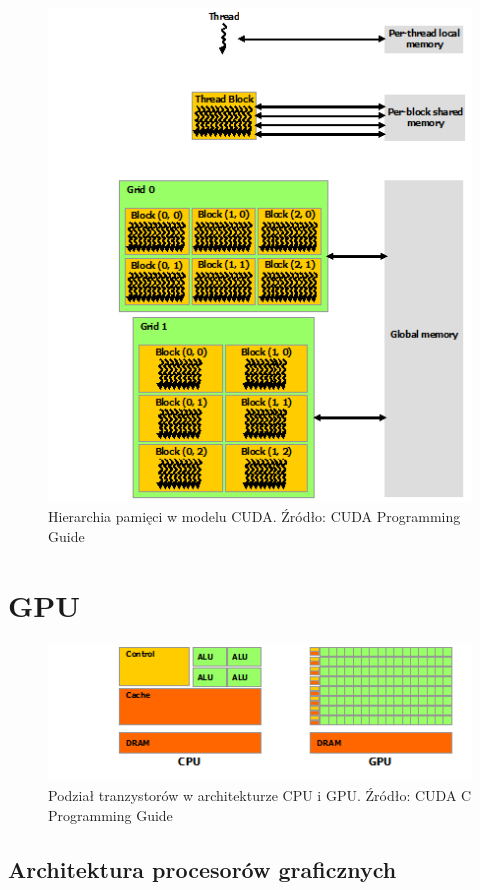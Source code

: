 \begin{figure}[ht]
\centering
\includegraphics[scale=0.8]{images/memory-hierarchy.png}
\caption{Hierarchia pamięci w modelu CUDA. Źródło: CUDA Programming Guide}
\label{hier}
\end{figure}

\section{GPU}


\begin{figure}[ht]
\centering
\includegraphics{images/gpu-devotes-more-transistors-to-data-processing.png}
\caption{Podział tranzystorów w architekturze CPU i GPU. Źródło: CUDA C Programming Guide}
\label{cpugpu}
\end{figure}

\subsection{Architektura procesorów graficznych}

